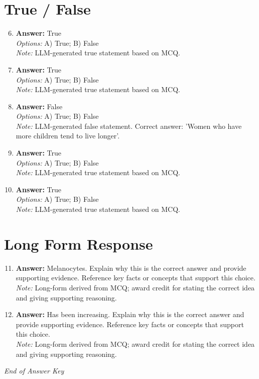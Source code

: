 \documentclass[12pt]{article}
\begin{document}
\section*{True / False}
\begin{enumerate}[label=\arabic*.]
\setcounter{enumi}{5}
\item \textbf{Answer:} True
\\ \textit{Options:} A) True; B) False
\\ \textit{Note:} LLM-generated true statement based on MCQ.
\item \textbf{Answer:} True
\\ \textit{Options:} A) True; B) False
\\ \textit{Note:} LLM-generated true statement based on MCQ.
\item \textbf{Answer:} False
\\ \textit{Options:} A) True; B) False
\\ \textit{Note:} LLM-generated false statement. Correct answer: 'Women who have more children tend to live longer'.
\item \textbf{Answer:} True
\\ \textit{Options:} A) True; B) False
\\ \textit{Note:} LLM-generated true statement based on MCQ.
\item \textbf{Answer:} True
\\ \textit{Options:} A) True; B) False
\\ \textit{Note:} LLM-generated true statement based on MCQ.
\end{enumerate}

\section*{Long Form Response}
\begin{enumerate}[label=\arabic*.]
\setcounter{enumi}{10}
\item \textbf{Answer:} Melanocytes. Explain why this is the correct answer and provide supporting evidence. Reference key facts or concepts that support this choice.
\\ \textit{Note:} Long-form derived from MCQ; award credit for stating the correct idea and giving supporting reasoning.
\item \textbf{Answer:} Has been increasing. Explain why this is the correct answer and provide supporting evidence. Reference key facts or concepts that support this choice.
\\ \textit{Note:} Long-form derived from MCQ; award credit for stating the correct idea and giving supporting reasoning.
\end{enumerate}

\vfill
\noindent\textit{End of Answer Key}
\end{document}

